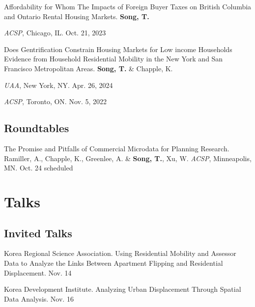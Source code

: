 \documentclass[10pt,letterpaper]{article}
\newcommand{\listitemspace}{0.25em}
\renewenvironment{itemize}
{\begin{list}{}{\setlength{\leftmargin}{1em}
\setlength{\parskip}{0em}
\setlength{\itemsep}{\listitemspace}
\setlength{\parsep}{\listitemspace}}}
{\end{list}}
\begin{document}
\begin{itemize}
  \item Affordability for Whom The Impacts of Foreign Buyer Taxes on British Columbia and Ontario Rental Housing Markets. \textbf{Song, T.}
    \begin{itemize}
      \addtolength{\leftskip}{1em}
      \setlength{\itemsep}{-0.4em}
      \item[•] \emph{ACSP}, Chicago, IL. Oct. 21, 2023
    \end{itemize}

  \item Does Gentrification Constrain Housing Markets for Low income Households Evidence from Household Residential Mobility in the New York and San Francisco Metropolitan Areas. \textbf{Song, T.} \& Chapple, K.
    \begin{itemize}
      \addtolength{\leftskip}{1em}
      \setlength{\itemsep}{-0.4em}
      \item[•] \emph{UAA}, New York, NY. Apr. 26, 2024
      \item[•] \emph{ACSP}, Toronto, ON. Nov. 5, 2022
    \end{itemize}
\end{itemize}

\subsection{Roundtables}
\begin{tablist}
  \item[2025] \tab{}The Promise and Pitfalls of Commercial Microdata for Planning Research. Ramiller, A., Chapple, K., Greenlee, A. \& \textbf{Song, T.}, Xu, W. \emph{ACSP}, Minneapolis, MN. Oct. 24 scheduled
\end{tablist}

\section{Talks}

\subsection{Invited Talks}
\begin{tablist}
  \item[2024] \tab{}Korea Regional Science Association. Using Residential Mobility and Assessor Data to Analyze the Links Between Apartment Flipping and Residential Displacement. Nov. 14
  \item[2022] \tab{}Korea Development Institute. Analyzing Urban Displacement Through Spatial Data Analysis. Nov. 16
\end{tablist}
\end{document}
